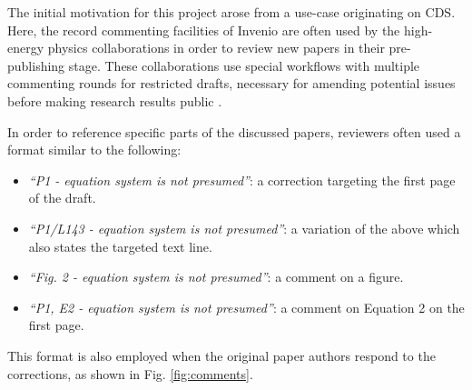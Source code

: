 
The initial motivation for this project arose from a use-case originating on
CDS.  Here, the record commenting facilities of Invenio are often used by the
high-energy physics collaborations in order to review new papers in their
pre-publishing stage.  These collaborations use special workflows with multiple
commenting rounds for restricted drafts, necessary for amending potential
issues before making research results public \cite{ref:ludmila}.

In order to reference specific parts of the discussed papers, reviewers often
used a format similar to the following:
  \begin{itemize}
      \item \textit{``P1 - equation system is not presumed''}: a correction
          targeting the first page of the draft.
      \item \textit{``P1/L143 - equation system is not presumed''}: a variation
        of the above which also states the targeted text line.
      \item \textit{``Fig. 2 - equation system is not presumed''}: a comment on
        a figure.
      \item \textit{``P1, E2 - equation system is not presumed''}: a comment on
        Equation 2 on the first page.
  \end{itemize}
This format is also employed when the original paper authors respond to the
corrections, as shown in Fig. \ref{fig:comments}.

